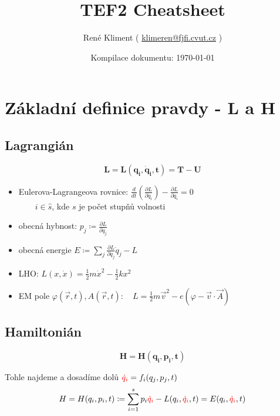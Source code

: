 \documentclass[a5paper,12pt]{article}
\author{
  René Kliment 
  ( \href{mailto:klimeren@fjfi.cvut.cz}{klimeren@fjfi.cvut.cz} )
}
\title{TEF2 Cheatsheet}
\date{Kompilace dokumentu: \today}
\begin{document}
\maketitle
\tableofcontents

\newpage


\section{Základní definice pravdy - L a H}

\subsection{Lagrangián}

\begin{equation*}
	\boldsymbol{L=L(q_i, \dot{q}_i, t) = T - U}
\end{equation*}

\begin{itemize}
	\item Eulerova-Lagrangeova rovnice: $\frac{d}{dt} (\frac{\partial L}{\partial \dot{q}_i}) - \frac{\partial L}{\partial q_i} = 0$\\
	$\qquad i \in \hat{s}$, kde $s$ je počet stupňů volnosti
	\item obecná hybnost: $p_j \coloneqq \frac{\partial L}{\partial \dot{q}_j}$
	\item obecná energie $E \coloneqq \sum_{j} \frac{\partial L}{\partial \dot{q}_j}\dot{q}_j - L$
	\item LHO: $L(x, \dot{x}) = \frac{1}{2}m\dot{x}^2 - \frac{1}{2}kx^2$
	\item EM pole $\varphi(\vec{r}, t), A(\vec{r}, t): \quad L = \frac{1}{2}m\vec{v}^2 - e(\varphi - \vec{v} \cdot \vec{A})$
\end{itemize}

\subsection{Hamiltonián}

\begin{equation*}
	\boldsymbol{H=H(q_i, p_i, t)}
\end{equation*}

Tohle najdeme a dosadíme dolů ${\color{red} \dot{q}_i} = f_i(q_j, p_j, t)$
\begin{equation*}
	H = H(q_i, p_i, t) \coloneqq \sum^{s}_{i=1} p_i {\color{red} \dot{q}_i} - L(q_i, {\color{red} \dot{q}_i}, t) = E(q_i, {\color{red} \dot{q}_i}, t)
\end{equation*}
\end{document}
